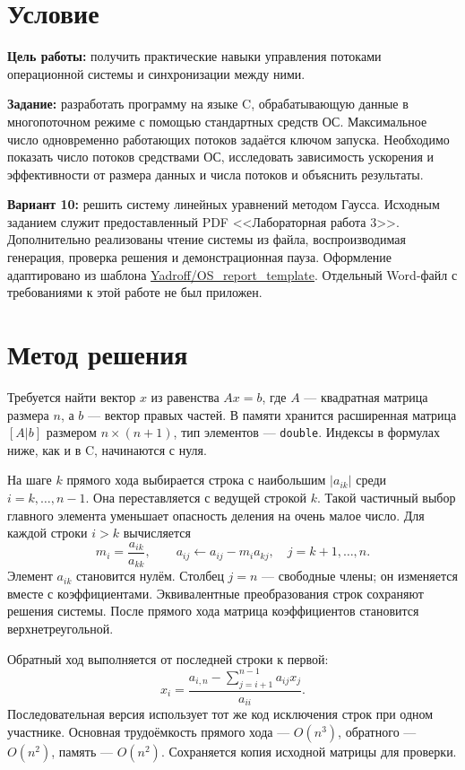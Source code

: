 \section{Условие}
\textbf{Цель работы:} получить практические навыки управления потоками
операционной системы и синхронизации между ними.

\textbf{Задание:} разработать программу на языке C, обрабатывающую данные
в многопоточном режиме с помощью стандартных средств ОС. Максимальное число
одновременно работающих потоков задаётся ключом запуска. Необходимо показать
число потоков средствами ОС, исследовать зависимость ускорения и эффективности
от размера данных и числа потоков и объяснить результаты.

\textbf{Вариант 10:} решить систему линейных уравнений методом Гаусса.
Исходным заданием служит предоставленный PDF <<Лабораторная работа 3>>.
Дополнительно реализованы чтение системы из файла, воспроизводимая генерация,
проверка решения и демонстрационная пауза. Оформление адаптировано из шаблона
\href{https://github.com/Yadroff/OS_report_template}{Yadroff/OS\_report\_template}.
Отдельный Word-файл с требованиями к этой работе не был приложен.

\section{Метод решения}
Требуется найти вектор $x$ из равенства $Ax=b$, где $A$ --- квадратная матрица
размера $n$, а $b$ --- вектор правых частей. В памяти хранится расширенная
матрица $[A|b]$ размером $n\times(n+1)$, тип элементов --- \texttt{double}.
Индексы в формулах ниже, как и в C, начинаются с нуля.

На шаге $k$ прямого хода выбирается строка с наибольшим $|a_{ik}|$ среди
$i=k,\ldots,n-1$. Она переставляется с ведущей строкой $k$. Такой частичный
выбор главного элемента уменьшает опасность деления на очень малое число.
Для каждой строки $i>k$ вычисляется
\[
 m_i=\frac{a_{ik}}{a_{kk}},\qquad
 a_{ij}\leftarrow a_{ij}-m_i a_{kj},\quad j=k+1,\ldots,n.
\]
Элемент $a_{ik}$ становится нулём. Столбец $j=n$ --- свободные члены;
он изменяется вместе с коэффициентами. Эквивалентные преобразования строк
сохраняют решения системы. После прямого хода матрица коэффициентов
становится верхнетреугольной.

Обратный ход выполняется от последней строки к первой:
\[
 x_i=\frac{a_{i,n}-\sum_{j=i+1}^{n-1}a_{ij}x_j}{a_{ii}}.
\]
Последовательная версия использует тот же код исключения строк при одном
участнике. Основная трудоёмкость прямого хода --- $O(n^3)$, обратного ---
$O(n^2)$, память --- $O(n^2)$. Сохраняется копия исходной матрицы для проверки.

